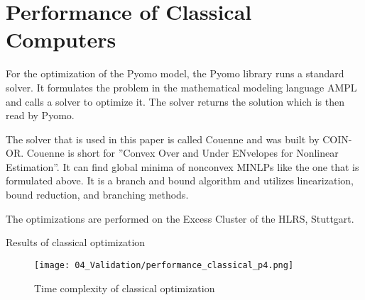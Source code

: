 \section{Performance of Classical Computers}

For the optimization of the Pyomo model, the Pyomo library runs a standard solver.
It formulates the problem in the mathematical modeling language AMPL
and calls a solver to optimize it.
The solver returns the solution which is then read by Pyomo.
\cite{PyomoAMPL}

The solver that is used in this paper is called Couenne and was built by COIN-OR.
Couenne is short for ''Convex Over and Under ENvelopes for Nonlinear Estimation''.
It can find global minima of nonconvex MINLPs like the one that is formulated above.
It is a branch and bound algorithm and utilizes linearization, bound reduction, and branching methods.
\cite{CoinorHome,CouenneRepo}

The optimizations are performed on the Excess Cluster of the HLRS, Stuttgart.
\cite{ExcessHLRS,HLRS}

\begin{table}
  \centering
  
  \caption{Results of classical optimization}
\end{table}

\begin{figure}
  \centering
  \texttt{[image: 04\_Validation/performance\_classical\_p4.png]}
  \caption{Time complexity of classical optimization}
\end{figure}
